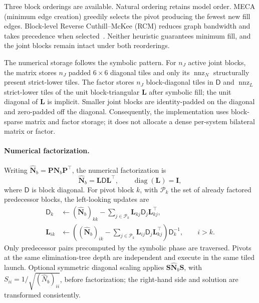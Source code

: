 \documentclass{article}
\newcommand{\Perm}{\mathbf{P}}        %
\newcommand{\Lfac}{\mathbf{L}}        %
\newcommand{\Dfac}{\mathsf{D}}         %
\newcommand{\Id}{\mathbf{I}}
\theoremstyle{plain}
\theoremstyle{definition}
\begin{document}
Three block orderings are available. Natural ordering retains model order.
MECA (minimum edge creation) greedily selects the pivot producing the fewest
new fill edges. Block-level Reverse Cuthill--McKee (RCM) reduces graph
bandwidth and takes precedence when selected~\cite{cuthill1969}. Neither
heuristic guarantees minimum fill, and the joint blocks remain intact under
both reorderings.

The numerical storage follows the symbolic pattern. For $n_J$ active joint
blocks, the matrix stores $n_J$ padded $6\times6$ diagonal tiles and only its
$\operatorname{nnz}_N$ structurally present strict-lower tiles. The factor
stores $n_J$ block-diagonal tiles in $\Dfac$ and
$\operatorname{nnz}_L$ strict-lower tiles of the unit block-triangular
$\Lfac$ after symbolic fill; the unit diagonal of $\Lfac$ is implicit. Smaller
joint blocks are identity-padded on the diagonal and zero-padded off the
diagonal. Consequently, the implementation uses block-sparse matrix and factor
storage; it does not allocate a dense per-system bilateral matrix or factor.

\paragraph{Numerical factorization.}
Writing $\widehat{\mathbf N}_b=\Perm\mathbf N_b\Perm^\top$, the numerical
factorization is
\begin{equation}
  \widehat{\mathbf N}_b=\Lfac\Dfac\Lfac^\top,
  \qquad \operatorname{diag}(\Lfac)=\Id,
  \label{eq:ldl-factor}
\end{equation}
where $\Dfac$ is block diagonal. For pivot block $k$, with $\mathcal P_k$ the
set of already factored predecessor blocks, the left-looking updates are
\begin{align}
 \Dfac_k &\leftarrow (\widehat{\mathbf N}_b)_{kk}
       -\sum_{j\in\mathcal P_k}\Lfac_{kj}\Dfac_j\Lfac_{kj}^{\top},
 \label{eq:ldl-diag}\\
 \Lfac_{ik} &\leftarrow
   \left((\widehat{\mathbf N}_b)_{ik}
       -\sum_{j\in\mathcal P_k}\Lfac_{ij}\Dfac_j\Lfac_{kj}^{\top}\right)
       \Dfac_k^{-1},
       \qquad i>k .
 \label{eq:ldl-offdiag}
\end{align}
Only predecessor pairs precomputed by the symbolic phase are traversed. Pivots
at the same elimination-tree depth are independent and execute in the same
tiled launch. Optional symmetric diagonal scaling applies
$\mathbf S\widehat{\mathbf N}_b\mathbf S$, with
$S_{ii}=1/\sqrt{(\widehat{N}_b)_{ii}}$, before factorization; the right-hand side and
solution are transformed consistently.
\end{document}
